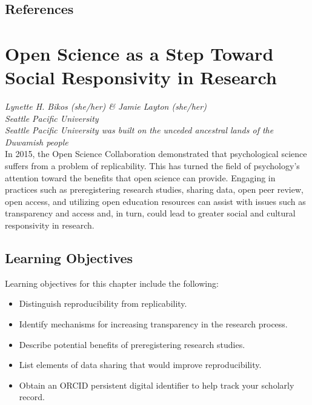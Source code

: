 \documentclass[
  11pt,
]{book}
\providecommand{\tightlist}{%
  \setlength{\itemsep}{0pt}\setlength{\parskip}{0pt}}
\begin{document}
\hypertarget{references}{%
\section{References}\label{references}}

\hypertarget{OpSci}{%
\chapter{Open Science as a Step Toward Social Responsivity in Research}\label{OpSci}}

\emph{Lynette H. Bikos (she/her) \& Jamie Layton (she/her)}\\
\emph{Seattle Pacific University}\\
\emph{Seattle Pacific University was built on the unceded ancestral lands of the Duwamish people}\\

In 2015, the Open Science Collaboration demonstrated that psychological science suffers from a problem of replicability. This has turned the field of psychology's attention toward the benefits that open science can provide. Engaging in practices such as preregistering research studies, sharing data, open peer review, open access, and utilizing open education resources can assist with issues such as transparency and access and, in turn, could lead to greater social and cultural responsivity in research.

\hypertarget{learning-objectives-1}{%
\section{Learning Objectives}\label{learning-objectives-1}}

Learning objectives for this chapter include the following:

\begin{itemize}
\tightlist
\item
  Distinguish reproducibility from replicability.
\item
  Identify mechanisms for increasing transparency in the research process.
\item
  Describe potential benefits of preregistering research studies.
\item
  List elements of data sharing that would improve reproducibility.
\item
  Obtain an ORCID persistent digital identifier to help track your scholarly record.
\end{itemize}
\end{document}
